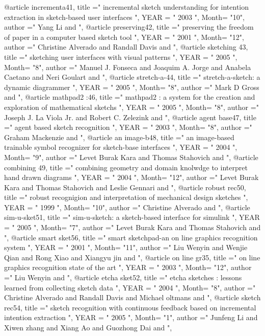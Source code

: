 @article{ incrementa41, 
  title ="  incremental sketch understanding for intention extraction in sketch-based user interfaces  ", 
 YEAR = " 2003  ",
Month= "10",
 author =" Yang Li    and  ",
}
@article{ preserving42, 
  title ="  preserving the freedom of paper in a computer based sketch tool  ", 
 YEAR = " 2001  ",
Month= "12",
 author =" Christine Alverado   and  Randall Davis   and  ",
}
@article{ sketching 43, 
  title ="  sketching user interfaces with visual patterns  ", 
 YEAR = " 2005  ",
Month= "8",
 author =" Manuel J. Fonseca   and  Joaquim A. Jorge   and  Anabela Caetano   and  Neri Goulart   and  ",
}
@article{ stretch-a-44, 
  title ="  stretch-a-sketch: a dynamic diagrammer  ", 
 YEAR = " 2005  ",
Month= "8",
 author =" Mark D Gross   and  ",
}
@article{ mathpad2 :46, 
  title ="  mathpad2 : a system for the creation and exploration of mathematical sketchs  ", 
 YEAR = " 2005  ",
Month= "8",
 author =" Joseph J. La Viola Jr.   and  Robert C. Zelezink   and  ",
}
@article{ agent base47, 
  title ="  agent based sketch recognition  ", 
 YEAR = " 2003  ",
Month= "8",
 author =" Graham Mackenzie   and  ",
}
@article{ an image-b48, 
  title ="  an image-based trainable symbol recognizer for sketch-base interfaces  ", 
 YEAR = " 2004  ",
Month= "9",
 author =" Levet Burak  Kara   and  Thomas Stahovich   and  ",
}
@article{ combining 49, 
  title ="  combining geometry and domain knolwdge to interpret hand drawn diagrams  ", 
 YEAR = " 2004  ",
Month= "12",
 author =" Levet Burak  Kara   and  Thomas Stahovich   and  Leslie Gennari   and  ",
}
@article{ robust rec50, 
  title ="  robust recognigion and interpretation of mechanical design sketches  ", 
 YEAR = " 1999  ",
Month= "10",
 author =" Christine Alverado   and  ",
}
@article{ sim-u-sket51, 
  title ="  sim-u-sketch: a sketch-based interface for simulink  ", 
 YEAR = " 2005  ",
Month= "7",
 author =" Levet Burak  Kara   and  Thomas Stahovich   and  ",
}
@article{ smart sket56, 
  title ="  smart sketchpad-an on line  graphics recognition system  ", 
 YEAR = " 2001  ",
Month= "11",
 author =" Liu Wenyin   and  Wenjie Qian   and  Rong Xiao   and  Xiangyu jin   and  ",
}
@article{ on line gr35, 
  title ="  on line graphics recognition state of the art   ", 
 YEAR = " 2003  ",
Month= "12",
 author =" Liu Wenyin   and  ",
}
@article{ etcha sket52, 
  title ="  etcha sketches : lessons learned from collecting sketch data  ", 
 YEAR = " 2004  ",
Month= "8",
 author =" Christine Alverado   and  Randall Davis   and  Michael oltmans   and  ",
}
@article{ sketch rec54, 
  title ="  sketch recognition with continuous feedback based on incremental intention extraction  ", 
 YEAR = " 2005  ",
Month= "1",
 author =" Junfeng Li   and  Xiwen zhang   and  Xiang Ao    and  Guozhong Dai   and  ",
}
